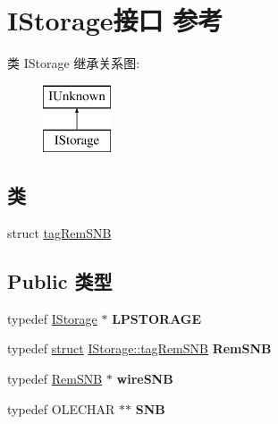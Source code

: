 \hypertarget{interface_i_storage}{}\section{I\+Storage接口 参考}
\label{interface_i_storage}
类 I\+Storage 继承关系图\+:\begin{figure}[H]
\begin{center}
\leavevmode
\includegraphics[height=2.000000cm]{interface_i_storage}
\end{center}
\end{figure}
\subsection*{类}
\begin{DoxyCompactItemize}
\item 
struct \hyperlink{struct_i_storage_1_1tag_rem_s_n_b}{tag\+Rem\+S\+NB}
\end{DoxyCompactItemize}
\subsection*{Public 类型}
\begin{DoxyCompactItemize}
\item 
\mbox{\label{interface_i_storage_a50cef0f0ae84686c8127ef3c13f9f440}} 
typedef \hyperlink{interface_i_storage}{I\+Storage} $\ast$ {\bfseries L\+P\+S\+T\+O\+R\+A\+GE}
\item 
\mbox{\label{interface_i_storage_a4e28567dd48dc7845d7fa9db5bd13336}} 
typedef \hyperlink{interfacestruct}{struct} \hyperlink{struct_i_storage_1_1tag_rem_s_n_b}{I\+Storage\+::tag\+Rem\+S\+NB} {\bfseries Rem\+S\+NB}
\item 
\mbox{\label{interface_i_storage_a1ff0c825db9ee1c751eefca4599c5376}} 
typedef \hyperlink{struct_i_storage_1_1tag_rem_s_n_b}{Rem\+S\+NB} $\ast$ {\bfseries wire\+S\+NB}
\item 
\mbox{\label{interface_i_storage_a60ce37abd38485653df3ba6a45aa19aa}} 
typedef O\+L\+E\+C\+H\+AR $\ast$$\ast$ {\bfseries S\+NB}
\end{DoxyCompactItemize}
